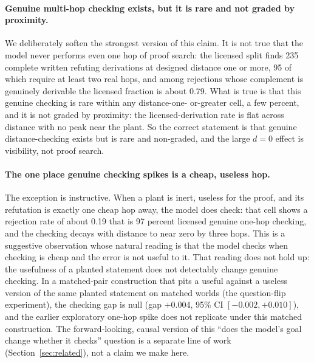 \paragraph{Genuine multi-hop checking exists, but it is rare and not graded
by proximity.} We deliberately soften the strongest version of this claim.
It is not true that the model never performs even one hop of proof search:
the licensed split finds 235 complete written refuting derivations at
designed distance one or more, 95 of which require at least two real hops,
and among rejections whose complement is genuinely derivable the licensed
fraction is about 0.79.
What is true is that this genuine checking is rare within any distance-one-
or-greater cell, a few percent, and it is not graded by proximity: the
licensed-derivation rate is flat across distance with no peak near the
plant.
So the correct statement is that genuine distance-checking exists but is
rare and non-graded, and the large $d{=}0$ effect is visibility, not proof
search.

\paragraph{The one place genuine checking spikes is a cheap, useless hop.}
The exception is instructive. When a plant is inert, useless for the proof,
and its refutation is exactly one cheap hop away, the model does check: that
cell shows a rejection rate of about 0.19 that is 97 percent licensed
genuine one-hop checking, and the checking decays with distance to near
zero by three hops.
This is a suggestive observation whose natural reading is that the model
checks when checking is cheap and the error is not useful to it. That reading
does not hold up: the usefulness of a planted statement does not detectably
change genuine checking. In a matched-pair construction that pits a useful
against a useless version of the same planted statement on matched worlds
(the question-flip experiment), the checking gap is null (gap $+0.004$, 95\%
CI $[-0.002, +0.010]$), and the earlier exploratory one-hop spike does not
replicate under this matched construction.
The forward-looking, causal version of this ``does the model's goal change
whether it checks'' question is a separate line of work
(Section~\ref{sec:related}), not a claim we make here.

